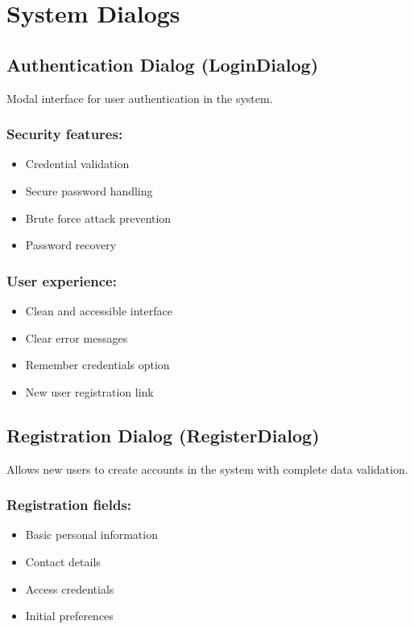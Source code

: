 \documentclass[conference]{IEEEtran}
\begin{document}
\section{System Dialogs}

\subsection{Authentication Dialog (LoginDialog)}
Modal interface for user authentication in the system.

\subsubsection{Security features:}
\begin{itemize}
    \item Credential validation
    \item Secure password handling
    \item Brute force attack prevention
    \item Password recovery
\end{itemize}

\subsubsection{User experience:}
\begin{itemize}
    \item Clean and accessible interface
    \item Clear error messages
    \item Remember credentials option
    \item New user registration link
\end{itemize}

\subsection{Registration Dialog (RegisterDialog)}
Allows new users to create accounts in the system with complete data validation.

\subsubsection{Registration fields:}
\begin{itemize}
    \item Basic personal information
    \item Contact details
    \item Access credentials
    \item Initial preferences
\end{itemize}
\end{document}

